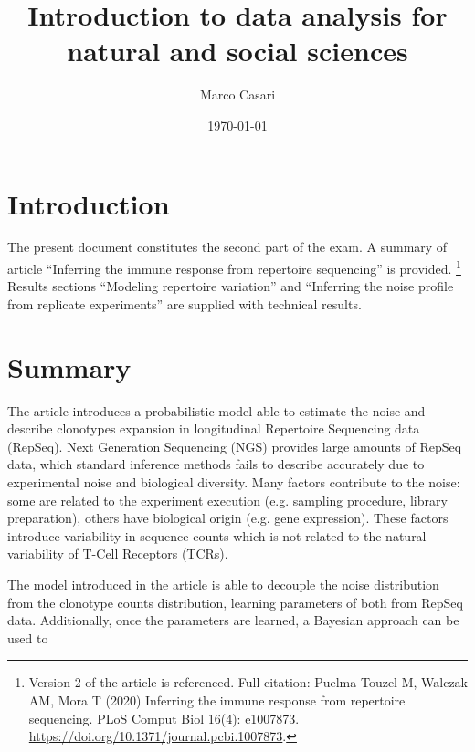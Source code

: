 \documentclass[a4paper]{article}
\title{Introduction to data analysis for natural and social sciences}
\author{Marco Casari}
\date{\today}
\begin{document}
\maketitle

\section{Introduction}
The present document constitutes the second part of the exam. A summary of article ``Inferring the immune response from repertoire sequencing'' is provided.%
\footnote{Version 2 of the article is referenced. Full citation: Puelma Touzel M, Walczak AM, Mora T (2020) Inferring the immune response from repertoire sequencing. PLoS Comput Biol 16(4): e1007873. \url{https://doi.org/10.1371/journal.pcbi.1007873}.}
Results sections ``Modeling repertoire variation'' and ``Inferring the noise profile from replicate experiments'' are supplied with technical results.



\section{Summary}
The article introduces a probabilistic model able to estimate the noise and describe clonotypes expansion in longitudinal Repertoire Sequencing data (RepSeq).
Next Generation Sequencing (NGS) provides large amounts of RepSeq data, which standard inference methods fails to describe accurately due to experimental noise and biological diversity. Many factors contribute to the noise: some are related to the experiment execution (e.g. sampling procedure, library preparation), others have biological origin (e.g. gene expression). These factors introduce variability in sequence counts which is not related to the natural variability of T-Cell Receptors (TCRs).

The model introduced in the article is able to decouple the noise distribution from the clonotype counts distribution, learning parameters of both from RepSeq data. Additionally, once the parameters are learned, a Bayesian approach can be used to 
\end{document}
